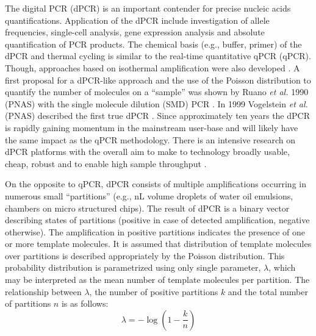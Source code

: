 \documentclass[a4,center,fleqn]{NAR}
\begin{document}
The digital PCR (dPCR) is an important contender for precise nucleic acids 
quantifications. Application of the dPCR include investigation of allele 
frequencies, single-cell analysis, gene expression analysis and absolute 
quantification of PCR products. The chemical basis (e.g., buffer, primer) of the 
dPCR and thermal cycling is similar to the real-time quantitative qPCR (qPCR). 
Though, approaches based on isothermal amplification were also developed 
\cite{pabinger_survey_2014, ludlow_2014, rodiger_r_2015}. A first proposal for a 
dPCR-like approach and the use of the Poisson distribution to quantify the 
number of molecules on a ``sample'' was shown by Ruano \textit{et al.} 1990 
(PNAS) with the single molecule dilution (SMD) PCR \cite{ruano_haplotype_1990}. 
In 1999 Vogelstein \textit{et al.} (PNAS) described the first true dPCR 
\cite{vogelstein_digital_1999}. Since approximately ten years the dPCR is 
rapidly gaining momentum in the mainstream user-base and will likely have the 
same impact as the qPCR methodology. There is an intensive research on dPCR 
platforms with the overall aim to make to technology broadly usable, cheap, 
robust and to enable high sample throughput \cite{selck_increased_2013, 
huggett_qpcr_2015, morley_digital_2014}. 

\enlargethispage{-65.1pt}

On the opposite to qPCR, dPCR consists of multiple amplifications occurring in 
numerous small ``partitions'' (e.g., nL volume droplets of water oil 
emulsions, chambers on micro structured chips). The result of dPCR is a binary 
vector describing states of partitions (positive in case of detected 
amplification, negative otherwise). The amplification in positive partitions 
indicates the presence of one or more template molecules. It is assumed that 
distribution of template molecules over partitions is described appropriately 
by the Poisson distribution. This probability distribution is parametrized 
using only single parameter, $\lambda$, which may be interpreted as the mean 
number of template molecules per partition. The relationship between 
$\lambda$, the number of positive partitions $k$ and the total number of 
partitions $n$ is as follows:
\begin{equation}
 \lambda = -\log{\left( 1 - \frac{k}{n} \right)}
\end{equation}
\end{document}
